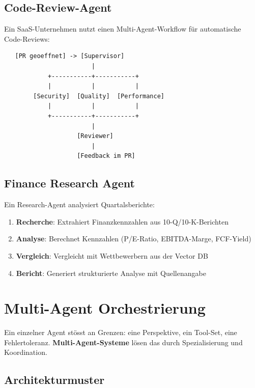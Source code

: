 \subsection{Code-Review-Agent}

Ein SaaS-Unternehmen nutzt einen Multi-Agent-Workflow für automatische Code-Reviews:

\begin{verbatim}
   [PR geoeffnet] -> [Supervisor]
                        |
            +-----------+-----------+
            |           |           |
        [Security]  [Quality]  [Performance]
            |           |           |
            +-----------+-----------+
                        |
                    [Reviewer]
                        |
                    [Feedback im PR]
\end{verbatim}

\subsection{Finance Research Agent}

Ein Research-Agent analysiert Quartalsberichte:

\begin{enumerate}[leftmargin=*]
    \item \textbf{Recherche}: Extrahiert Finanzkennzahlen aus 10-Q/10-K-Berichten
    \item \textbf{Analyse}: Berechnet Kennzahlen (P/E-Ratio, EBITDA-Marge, FCF-Yield)
    \item \textbf{Vergleich}: Vergleicht mit Wettbewerbern aus der Vector DB
    \item \textbf{Bericht}: Generiert strukturierte Analyse mit Quellenangabe
\end{enumerate}

\section{Multi-Agent Orchestrierung}
\label{sec:multiagent}

Ein einzelner Agent stösst an Grenzen: eine Perspektive, ein Tool-Set, eine Fehlertoleranz. \textbf{Multi-Agent-Systeme} lösen das durch Spezialisierung und Koordination.

\subsection{Architekturmuster}

